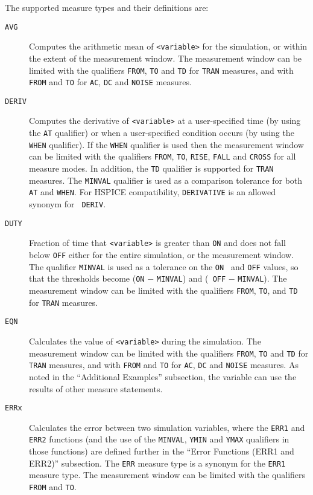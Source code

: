 \begin{Command}
\begin{Arguments}
The supported measure types and their definitions are:

\begin{description}
  \item[\tt AVG] Computes the arithmetic mean of {\tt <variable>} for
    the simulation, or within the extent of the measurement window.
    The measurement window can be limited with the qualifiers {\tt FROM},
    {\tt TO} and {\tt TD} for {\tt TRAN} measures, and with {\tt FROM}
    and {\tt TO} for {\tt AC}, {\tt DC} and {\tt NOISE} measures.

  \item[\tt DERIV] Computes the derivative of {\tt <variable>} at a
    user-specified time (by using the {\tt AT} qualifier) or when a
    user-specified condition occurs (by using the {\tt WHEN}
    qualifier). If the {\tt WHEN} qualifier is used then the
    measurement window can be limited with the qualifiers {\tt FROM},
    {\tt TO}, {\tt RISE}, {\tt FALL} and {\tt CROSS} for all measure
    modes.  In addition, the {\tt TD} qualifier is supported for
    {\tt TRAN} measures. The {\tt MINVAL} qualifier is used as a
    comparison tolerance for both {\tt AT} and {\tt WHEN}.  For HSPICE
    compatibility, {\tt DERIVATIVE} is an allowed synonym for {\tt
    DERIV}.

  \item[\tt DUTY] Fraction of time that {\tt <variable>} is greater than
   {\tt ON} and does not fall below {\tt OFF} either for the entire
    simulation, or the measurement window. The qualifier {\tt MINVAL}
    is used as a tolerance on the {\tt ON } and {\tt OFF} values, so
    that the thresholds become ({\tt ON} $-$ {\tt MINVAL}) and ({\tt
    OFF} $-$ {\tt MINVAL}).  The measurement window can be limited
    with the qualifiers {\tt FROM}, {\tt TO}, and {\tt TD} for
   {\tt TRAN} measures.

\item[\tt EQN] Calculates the value of {\tt <variable>} during the simulation.
    The measurement window can be limited with the qualifiers {\tt FROM},
    {\tt TO} and {\tt TD} for {\tt TRAN} measures, and with {\tt FROM}
    and {\tt TO} for {\tt AC}, {\tt DC} and {\tt NOISE} measures.  As noted in the
    ``Additional Examples'' subsection, the variable can use the
    results of other measure statements.

\item[\tt ERRx] Calculates the error between two simulation variables, where
    the {\tt ERR1} and {\tt ERR2} functions (and the use of the {\tt MINVAL},
    {\tt YMIN} and {\tt YMAX} qualifiers in those functions) are defined further
    in the ``Error Functions (ERR1 and ERR2)'' subsection.  The {\tt ERR} measure
    type is a synonym for  the {\tt ERR1} measure type.  The measurement
    window can be limited  with the qualifiers {\tt FROM} and {\tt TO}.


\end{description}
\end{Arguments}
\end{Command}
